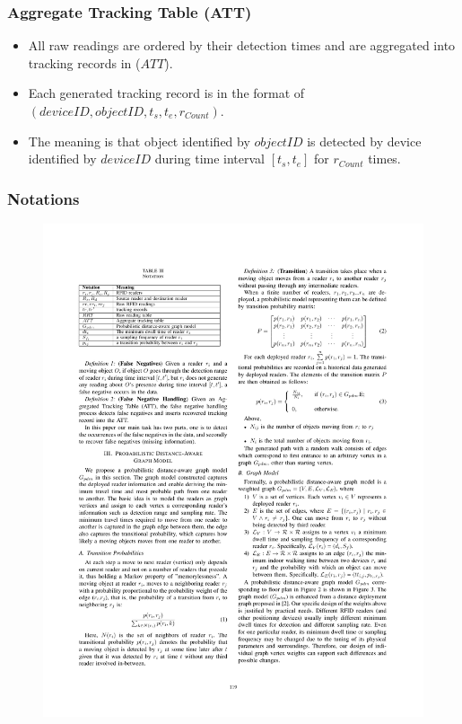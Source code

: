 \begin{frame}
\frametitle{Aggregate Tracking Table (ATT)~\cite{baba2013spatiotemporal}}

\begin{itemize}

  \item All raw readings are ordered by their detection times and are aggregated into tracking records in ($ATT$).

  \item Each generated tracking record is in the format of $(deviceID, objectID, t_s, t_e, r_{Count})$.

  \item The meaning is that object identified by $objectID$ is detected by device identified by $deviceID$ during time interval $[t_s, t_e]$ for $r_{Count}$ times.
\end{itemize}

\end{frame}


\begin{frame}
\frametitle{Notations}

\begin{figure}[tb]
  \includegraphics[width=\columnwidth]{figures/3-3/3-3-12.pdf}
\end{figure}

\end{frame}

